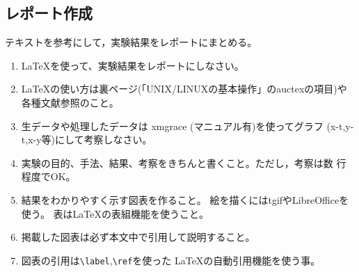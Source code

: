 \documentclass{jarticle}
\begin{document}
\subsection{レポート作成}

テキストを参考にして，実験結果をレポートにまとめる。

\begin{enumerate}
\item \LaTeX を使って、実験結果をレポートにしなさい。
\item \LaTeX の使い方は裏ページ(「UNIX/LINUXの基本操作」のauctexの項目)や
  各種文献参照のこと。
\item  生データや処理したデータは xmgrace (マニュアル有)を使ってグラフ
  (x-t,y-t,x-y等)にして考察しなさい。
\item 実験の目的、手法、結果、考察をきちんと書くこと。ただし，考察は数
  行程度でOK。
\item 結果をわかりやすく示す図表を作ること。
  絵を描くにはtgifやLibreOfficeを使う。
  表は\LaTeX の表組機能を使うこと。
\item 掲載した図表は必ず本文中で引用して説明すること。
\item 図表の引用は\verb|\label|,\verb|\ref|を使った
  \LaTeX の自動引用機能を使う事。
\end{enumerate}


\end{document}
